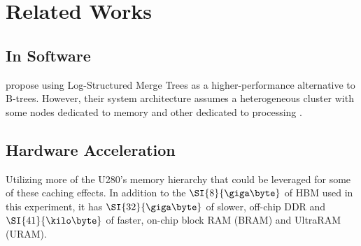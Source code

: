 \chapter{Related Works}

\section{In Software}

\citeauthor{dlsm} propose using Log-Structured Merge Trees as a higher-performance alternative to B-trees. However, their system architecture assumes a heterogeneous cluster with some nodes dedicated to memory and other dedicated to processing \autocite{dlsm}.


\section{Hardware Acceleration}

Utilizing more of the U280's memory hierarchy that could be leveraged for some of these caching effects. In addition to the $\SI{8}{\giga\byte}$ of HBM used in this experiment, it has $\SI{32}{\giga\byte}$ of slower, off-chip DDR and $\SI{41}{\kilo\byte}$ of faster, on-chip block RAM (BRAM) and UltraRAM (URAM).
